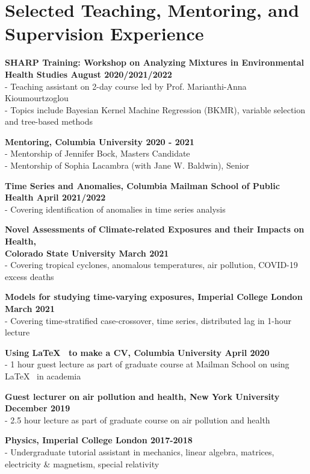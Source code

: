 \section*{Selected Teaching, Mentoring, and Supervision Experience}

\noindent \textbf{SHARP Training: Workshop on Analyzing Mixtures in Environmental Health Studies \hfill August 2020/2021/2022}\\
\noindent - Teaching assistant on 2-day course led by Prof. Marianthi-Anna Kioumourtzoglou\\
\noindent - Topics include Bayesian Kernel Machine Regression (BKMR), variable selection and tree-based methods \bigskip

\noindent \textbf{Mentoring, Columbia University \hfill 2020 - 2021}\\
\noindent - Mentorship of Jennifer Bock, Masters Candidate\\
\noindent - Mentorship of Sophia Lacambra (with Jane W. Baldwin), Senior
\bigskip

\noindent \textbf{Time Series and Anomalies, Columbia Mailman School of Public Health \hfill April 2021/2022}\\
\noindent - Covering identification of anomalies in time series analysis
\bigskip

\noindent \textbf{Novel Assessments of Climate-related Exposures and their Impacts on Health, \\Colorado State University \hfill March 2021}\\
\noindent - Covering tropical cyclones, anomalous temperatures, air pollution, COVID-19 excess deaths \bigskip

\noindent \textbf{Models for studying time-varying exposures, Imperial College London \hfill March 2021}\\
\noindent - Covering time-stratified case-crossover, time series, distributed lag in 1-hour lecture
\bigskip

\noindent \textbf{Using \LaTeX ~ to make a CV, Columbia University \hfill April 2020}\\
\noindent - 1 hour guest lecture as part of graduate course at Mailman School on using \LaTeX ~ in academia \bigskip

\noindent \textbf{Guest lecturer on air pollution and health, New York University \hfill December 2019}\\
\noindent - 2.5 hour lecture as part of graduate course on air pollution and health \bigskip

\noindent \textbf{Physics, Imperial College London \hfill 2017-2018}\\
\noindent - Undergraduate tutorial assistant in mechanics, linear algebra, matrices, electricity \& magnetism, special relativity
\bigskip

